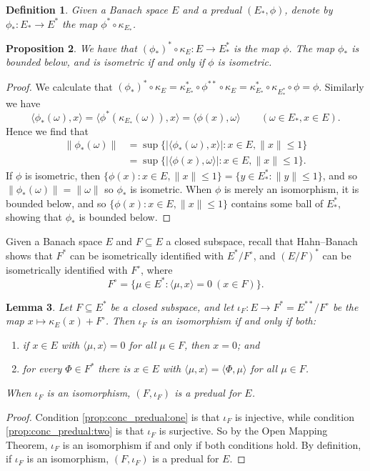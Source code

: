 \documentclass[a4paper,11pt]{article}
\theoremstyle{plain}
\newtheorem{proposition}{Proposition}[section]
\newtheorem{lemma}[proposition]{Lemma}
\newtheorem{definition}[proposition]{Definition}
\theoremstyle{remark}
\newcommand{\ip}[2]{{\langle {#1} , {#2} \rangle}}
\begin{document}
\begin{definition}
Given a Banach space $E$ and a predual $(E_*, \phi)$, denote by $\phi_* \colon E_* \to E^*$ the map $\phi^* \circ \kappa_{E_*}$.
\end{definition}

\begin{proposition}\label{prop:predual_iso_map}
We have that $(\phi_*)^* \circ \kappa_E \colon E \to E_*^*$ is the map $\phi$.  The map $\phi_*$ is bounded below, and is isometric if and only if $\phi$ is isometric.
\end{proposition}
\begin{proof}
We calculate that $(\phi_*)^* \circ \kappa_E = \kappa_{E_*}^* \circ \phi^{**} \circ \kappa_E = \kappa^*_{E_*} \circ \kappa_{E_*^*}\circ\phi = \phi$.  Similarly we have
\[ \ip{\phi_*(\omega)}{x} = \ip{\phi^*(\kappa_{E_*}(\omega))}{x}
= \ip{\phi(x)}{\omega}
\qquad (\omega\in E_*, x\in E). \]
Hence we find that
\begin{align*}
\| \phi_*(\omega) \|
&= \sup\bigl\{ |\ip{\phi_*(\omega)}{x}| : x\in E, \|x\|\leq 1 \bigr\}  \\
&= \sup\bigl\{ |\ip{\phi(x)}{\omega}| : x\in E, \|x\|\leq 1 \bigr\}.
\end{align*}
If $\phi$ is isometric, then $\{ \phi(x) : x\in E, \|x\|\leq 1 \} = \{ y\in E_*^* : \|y\|\leq 1\}$, and so $\|\phi_*(\omega)\| = \|\omega\|$ so $\phi_*$ is isometric.  When $\phi$ is merely an isomorphism, it is bounded below, and so $\{ \phi(x) : x\in E, \|x\|\leq 1 \}$ contains some ball of $E_*^*$, showing that $\phi_*$ is bounded below.
\end{proof}

Given a Banach space $E$ and $F\subseteq E$ a closed subspace, recall that Hahn--Banach shows that $F^*$ can be isometrically identified with $E^* / F^\circ$, and $(E/F)^*$ can be isometrically identified with $F^\circ$, where
\[ F^\circ = \bigl\{ \mu\in E^* : \ip{\mu}{x}=0 \ (x\in F) \bigr\}. \]

\begin{lemma}\label{lem:conc_predual}
Let $F \subseteq E^*$ be a closed subspace, and let $\iota_F \colon E \to F^* = E^{**} / F^\circ$ be the map $x \mapsto \kappa_E(x) + F^\circ$.  Then $\iota_F$ is an isomorphism if and only if both:
\begin{enumerate}[(1)]
  \item\label{prop:conc_predual:one} if $x\in E$ with $\ip{\mu}{x}=0$ for all $\mu\in F$, then $x=0$; and
  \item\label{prop:conc_predual:two} for every $\Phi\in F^*$ there is $x\in E$ with $\ip{\mu}{x} = \ip{\Phi}{\mu}$ for all $\mu\in F$.
\end{enumerate}
When $\iota_F$ is an isomorphism, $(F, \iota_F)$ is a predual for $E$.
\end{lemma}
\begin{proof}
Condition \ref{prop:conc_predual:one} is that $\iota_F$ is injective, while condition \ref{prop:conc_predual:two} is that $\iota_F$ is surjective.  So by the Open Mapping Theorem, $\iota_F$ is an isomorphism if and only if both conditions hold.  By definition, if $\iota_F$ is an isomorphism, $(F, \iota_F)$ is a predual for $E$.
\end{proof}
\end{document}
